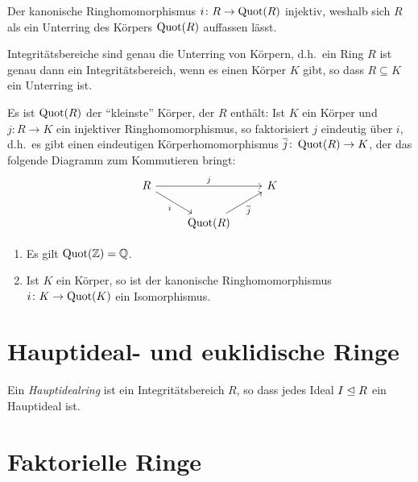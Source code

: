 Der kanonische Ringhomomorphismus $i \colon R \to \operatorname{Quot}(R)$ injektiv, weshalb sich $R$ als ein Unterring des Körpers $\operatorname{Quot}(R)$ auffassen lässt.

\begin{corollary}
  Integritätsbereiche sind genau die Unterring von Körpern, d.h.\ ein Ring $R$ ist genau dann ein Integritätsbereich, wenn es einen Körper $K$ gibt, so dass $R \subseteq K$ ein Unterring ist.
\end{corollary}

Es ist $\operatorname{Quot}(R)$ der \enquote{kleinste} Körper, der $R$ enthält:
Ist $K$ ein Körper und $j \colon R \to K$ ein injektiver Ringhomomorphismus, so faktorisiert $j$ eindeutig über $i$, d.h.\ es gibt einen eindeutigen Körperhomomorphismus $\overline{j} \colon \operatorname{Quot}(R) \to K$, der das folgende Diagramm zum Kommutieren bringt:
\[
  \begin{tikzcd}
      R
      \arrow{rr}[above]{j}
      \arrow{dr}[below left]{i}
    & {}
    & K
    \\
      {}
    & \Quot{R}
      \arrow{ur}[below right]{\induced{j}}
    & {}
  \end{tikzcd}
\]

\begin{example}
  \begin{enumerate}
    \item
      Es gilt $\operatorname{Quot}(\mathbb{Z}) = \mathbb{Q}$.
    \item
      Ist $K$ ein Körper, so ist der kanonische Ringhomomorphismus $i \colon K \to \operatorname{Quot}(K)$ ein Isomorphismus.
  \end{enumerate}
\end{example}









\section{Hauptideal- und euklidische Ringe}

\begin{definition}
  Ein \emph{Hauptidealring} ist ein Integritätsbereich $R$, so dass jedes Ideal $I \mathrel{\trianglelefteq} R$ ein Hauptideal ist.
\end{definition}





\section{Faktorielle Ringe}





